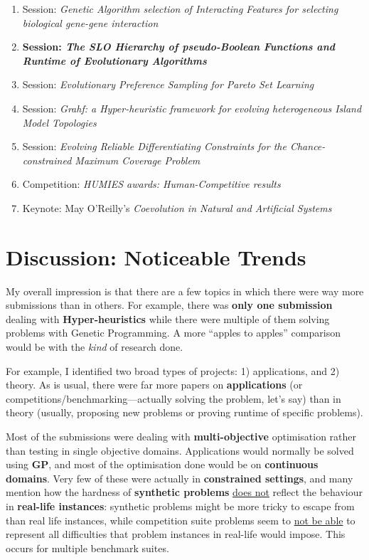 \documentclass[11pt, letterpaper, oneside]{article}
\begin{document}
\begin{enumerate}
    \item Session: \textit{Genetic Algorithm selection of Interacting Features for selecting biological gene-gene interaction}
    \item \textbf{Session: \textit{The SLO Hierarchy of pseudo-Boolean Functions and Runtime of Evolutionary Algorithms}}
    \item Session: \textit{Evolutionary Preference Sampling for Pareto Set Learning}
    \item Session: \textit{Grahf: a Hyper-heuristic framework for evolving heterogeneous Island Model Topologies}
    \item Session: \textit{Evolving Reliable Differentiating Constraints for the Chance-constrained Maximum Coverage Problem}
    \item Competition: \textit{HUMIES awards: Human-Competitive results}
    \item Keynote: May O'Reilly's \textit{Coevolution in Natural and Artificial Systems}
\end{enumerate}


\section{Discussion: Noticeable Trends}

My overall impression is that there are a few topics in which there were way more submissions than in others.
For example, there was \textbf{only one submission} dealing with \textbf{Hyper-heuristics} while there were multiple of them {solving problems with Genetic Programming}.
A more ``apples to apples'' comparison would be with the \textit{kind} of research done.

For example, I identified two broad types of projects: 1) applications, and 2) theory.
As is usual, there were far more papers on \textbf{applications} (or competitions/benchmarking---actually solving the problem, let's say) than in theory (usually, proposing new problems or proving runtime of specific problems).

Most of the submissions were dealing with \textbf{multi-objective} optimisation rather than testing in single objective domains.
Applications would normally be solved using \textbf{GP}, and most of the optimisation done would be on \textbf{continuous domains}.
Very few of these were actually in \textbf{constrained settings}, and many mention how the hardness of \textbf{synthetic problems} \underline{does not} reflect the behaviour in \textbf{real-life instances}:
synthetic problems might be more tricky to escape from than real life instances, while competition suite problems seem to \underline{not be able} to represent all difficulties that problem instances in real-life would impose.
This occurs for multiple benchmark suites.
\end{document}
